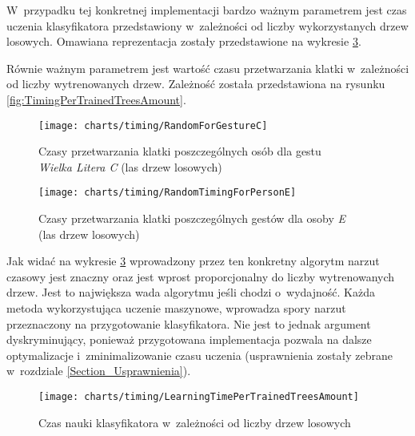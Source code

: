     W~przypadku tej konkretnej implementacji bardzo ważnym parametrem jest czas uczenia klasyfikatora przedstawiony w~zależności od liczby wykorzystanych drzew losowych. Omawiana reprezentacja zostały przedstawione na wykresie \ref{fig:LearningTime}.

    Równie ważnym parametrem jest wartość czasu przetwarzania klatki w~zależności od liczby wytrenowanych drzew. Zależność została przedstawiona na rysunku \ref{fig:TimingPerTrainedTreesAmount}.

    \newpage
    \begin{figure}[!ht]
      \centering
      \texttt{[image: charts/timing/RandomForGestureC]}
      \caption[Czasy przetwarzania klatki poszczególnych osób dla gestu\\Wielka Litera C (las drzew losowych)]
              {Czasy przetwarzania klatki poszczególnych osób dla gestu\\\textit{Wielka Litera C} (las drzew losowych)}
      \label{fig:RandomForGestureC}
    \end{figure}

    \begin{figure}[!ht]
      \centering
      \texttt{[image: charts/timing/RandomTimingForPersonE]}
      \caption[Czasy przetwarzania klatki poszczególnych gestów dla osoby E\\(las drzew losowych)]
              {Czasy przetwarzania klatki poszczególnych gestów dla osoby \textit{E}\\(las drzew losowych)}
      \label{fig:RandomTimingForPersonE}
    \end{figure}

    \newpage
    Jak widać na wykresie \ref{fig:LearningTime} wprowadzony przez ten konkretny algorytm narzut czasowy jest znaczny oraz jest wprost proporcjonalny do liczby wytrenowanych drzew. Jest to największa wada algorytmu jeśli chodzi o~wydajność. Każda metoda wykorzystująca uczenie maszynowe, wprowadza spory narzut przeznaczony na przygotowanie klasyfikatora. Nie jest to jednak argument dyskryminujący, ponieważ przygotowana implementacja pozwala na dalsze optymalizacje i~zminimalizowanie czasu uczenia (usprawnienia zostały zebrane w~rozdziale \ref{Section_Usprawnienia}).

    \begin{figure}[!ht]
      \centering
      \texttt{[image: charts/timing/LearningTimePerTrainedTreesAmount]}
      \caption[Czas nauki klasyfikatora w~zależności od liczby drzew losowych]
              {Czas nauki klasyfikatora w~zależności od liczby drzew losowych}
      \label{fig:LearningTime}
    \end{figure}

